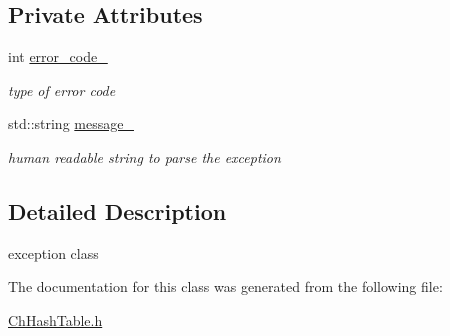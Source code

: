 \subsection*{Private Attributes}
\begin{DoxyCompactItemize}
\item 
\hypertarget{classHashTableException_a7d5598807934af3fe43e4d99c0c4f05d}{int \hyperlink{classHashTableException_a7d5598807934af3fe43e4d99c0c4f05d}{error\-\_\-code\-\_\-}}\label{classHashTableException_a7d5598807934af3fe43e4d99c0c4f05d}

\begin{DoxyCompactList}\small\item\em type of error code \end{DoxyCompactList}\item 
\hypertarget{classHashTableException_ae11c6291eb334b4574e8bb91c8a1744c}{std\-::string \hyperlink{classHashTableException_ae11c6291eb334b4574e8bb91c8a1744c}{message\-\_\-}}\label{classHashTableException_ae11c6291eb334b4574e8bb91c8a1744c}

\begin{DoxyCompactList}\small\item\em human readable string to parse the exception \end{DoxyCompactList}\end{DoxyCompactItemize}


\subsection{Detailed Description}
exception class 

The documentation for this class was generated from the following file\-:\begin{DoxyCompactItemize}
\item 
\hyperlink{ChHashTable_8h}{Ch\-Hash\-Table.\-h}\end{DoxyCompactItemize}
